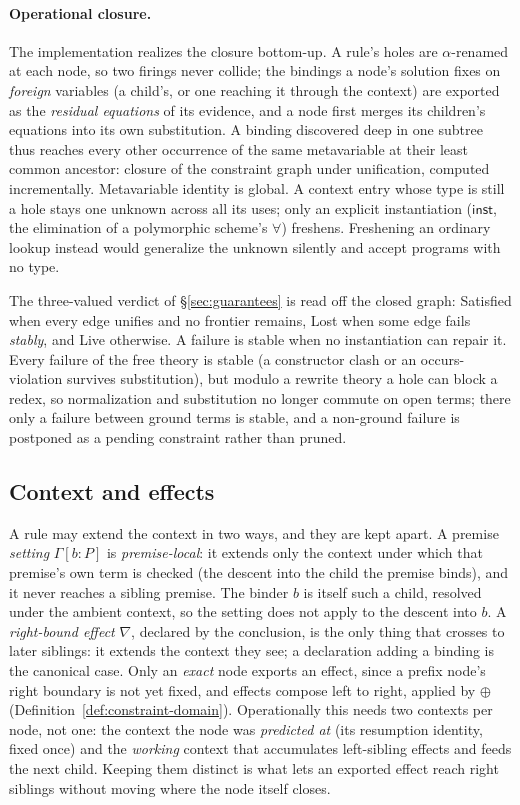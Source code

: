 \paragraph{Operational closure.}
The implementation realizes the closure bottom-up. A rule's holes are
$\alpha$-renamed at each node, so two firings never collide; the bindings a
node's solution fixes on \emph{foreign} variables (a child's, or one reaching
it through the context) are exported as the \emph{residual equations} of its
evidence, and a node first merges its children's equations into its own
substitution. A binding discovered deep in one subtree thus reaches every
other occurrence of the same metavariable at their least common ancestor:
closure of the constraint graph under unification, computed incrementally.
Metavariable identity is global. A context entry whose type is still a hole
stays one unknown across all its uses; only an explicit instantiation
($\mathsf{inst}$, the elimination of a polymorphic scheme's $\forall$)
freshens. Freshening an ordinary lookup instead would generalize the unknown
silently and accept programs with no type.

The three-valued verdict of \S\ref{sec:guarantees} is read off the closed graph:
\textsf{Satisfied} when every edge unifies and no frontier remains, \textsf{Lost}
when some edge fails \emph{stably}, and \textsf{Live} otherwise. A failure is
stable when no instantiation can repair it. Every failure of the free theory is
stable (a constructor clash or an occurs-violation survives substitution), but
modulo a rewrite theory a hole can block a redex, so normalization and
substitution no longer commute on open terms; there only a failure between
ground terms is stable, and a non-ground failure is postponed as a pending
constraint rather than pruned.

\subsection{Context and effects}
\label{sec:effects}

A rule may extend the context in two ways, and they are kept apart. A premise
\emph{setting} $\Gamma[b:P]$ is \emph{premise-local}: it extends only the
context under which that premise's own term is checked (the descent into the
child the premise binds), and it never reaches a sibling premise. The binder $b$
is itself such a child, resolved under the ambient context, so the setting does
not apply to the descent into $b$. A \emph{right-bound effect} $\nabla$, declared
by the conclusion, is the only thing that crosses to later siblings: it extends
the context they see; a declaration adding a binding is the canonical case. Only
an \emph{exact} node exports an effect, since a prefix node's right boundary is
not yet fixed, and effects compose left to right, applied by $\oplus$
(Definition~\ref{def:constraint-domain}). Operationally this needs two contexts
per node, not one: the context the node was \emph{predicted at} (its
resumption identity, fixed once) and the \emph{working} context that
accumulates left-sibling effects and feeds the next child. Keeping them distinct
is what lets an exported effect reach right siblings without moving where the
node itself closes.

